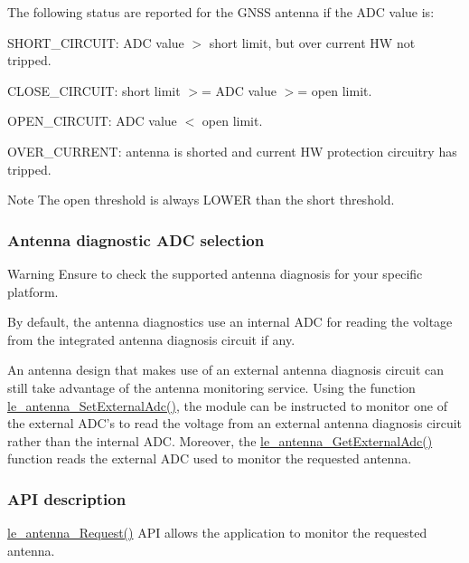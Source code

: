 The following status are reported for the G\+N\+S\+S antenna if the A\+D\+C value is\+:
\begin{DoxyItemize}
\item S\+H\+O\+R\+T\+\_\+\+C\+I\+R\+C\+U\+I\+T\+: A\+D\+C value $>$ short limit, but over current H\+W not tripped.
\item C\+L\+O\+S\+E\+\_\+\+C\+I\+R\+C\+U\+I\+T\+: short limit $>$= A\+D\+C value $>$= open limit.
\item O\+P\+E\+N\+\_\+\+C\+I\+R\+C\+U\+I\+T\+: A\+D\+C value $<$ open limit.
\item O\+V\+E\+R\+\_\+\+C\+U\+R\+R\+E\+N\+T\+: antenna is shorted and current H\+W protection circuitry has tripped.
\end{DoxyItemize}

\begin{DoxyNote}{Note}
The open threshold is always L\+O\+W\+E\+R than the short threshold.
\end{DoxyNote}
\hypertarget{c_antenna_le_antenna_gnss_diag_adc_selection}{}\subsubsection{Antenna diagnostic A\+D\+C selection}\label{c_antenna_le_antenna_gnss_diag_adc_selection}
\begin{DoxyWarning}{Warning}
Ensure to check the supported antenna diagnosis for your specific platform.
\end{DoxyWarning}
By default, the antenna diagnostics use an internal A\+D\+C for reading the voltage from the integrated antenna diagnosis circuit if any.

An antenna design that makes use of an external antenna diagnosis circuit can still take advantage of the antenna monitoring service. Using the function \hyperlink{le__antenna__interface_8h_a691370edf658b655a0f72b285dc5d00a}{le\+\_\+antenna\+\_\+\+Set\+External\+Adc()}, the module can be instructed to monitor one of the external A\+D\+C’s to read the voltage from an external antenna diagnosis circuit rather than the internal A\+D\+C. Moreover, the \hyperlink{le__antenna__interface_8h_a095510ac1da6efaf15db134321a012b3}{le\+\_\+antenna\+\_\+\+Get\+External\+Adc()} function reads the external A\+D\+C used to monitor the requested antenna.\hypertarget{c_antenna_API_desc}{}\subsubsection{A\+P\+I description}\label{c_antenna_API_desc}
\hyperlink{le__antenna__interface_8h_af768fcc154de42aecd549ff10e600a65}{le\+\_\+antenna\+\_\+\+Request()} A\+P\+I allows the application to monitor the requested antenna.

